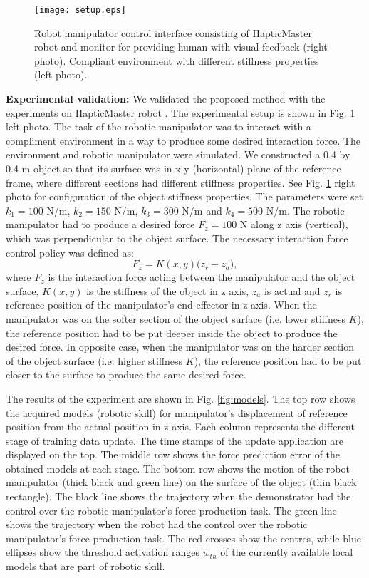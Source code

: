 \begin{figure}[!t]
	\centering
	\texttt{[image: setup.eps]}
	\caption{Robot manipulator control interface consisting of HapticMaster robot and monitor for providing human with visual feedback (right photo). Compliant environment with different stiffness properties (left photo).}
	\label{fig:setup}
\end{figure}

\textbf{Experimental validation:} We validated the proposed method with the experiments on HapticMaster robot \cite{Linde2002}. The experimental setup is shown in Fig. \ref{fig:setup} left photo. The task of the robotic manipulator was to interact with a compliment environment in a way to produce some desired interaction force. The environment and robotic manipulator were simulated. We constructed a 0.4 by 0.4 m object so that its surface was in x-y (horizontal) plane of the reference frame, where different sections had different stiffness properties. See Fig. \ref{fig:setup} right photo for configuration of the object stiffness properties. The parameters were set $k_1=100$ N/m, $k_2=150$ N/m, $k_3=300$ N/m and $k_4=500$ N/m. The robotic manipulator had to produce a desired force $F_z=100$ N along z axis (vertical), which was perpendicular to the object surface. The necessary interaction force control policy was defined as:
\begin{equation}
F_{z} = K(x,y) \big(z_r-z_a\big),\label{en:robotimp}
\end{equation}
where $F_{z}$ is the interaction force acting between the manipulator and the object surface, $K(x,y)$ is the stiffness of the object in z axis, $z_a$ is actual and $z_r$ is reference position of the manipulator's end-effector in z axis. When the manipulator was on the softer section of the object surface (i.e. lower stiffness $K$), the reference position had to be put deeper inside the object to produce the desired force. In opposite case, when the manipulator was on the harder section of the object surface (i.e. higher stiffness $K$), the reference position had to be put closer to the surface to produce the same desired force.

The results of the experiment are shown in Fig. \ref{fig:models}. The top row shows the acquired models (robotic skill) for manipulator's displacement of reference position from the actual position in z axis. Each column represents the different stage of training data update. The time stamps of the update application are displayed on the top. The middle row shows the force prediction error of the obtained models at each stage. The bottom row shows the motion of the robot manipulator (thick black and green line) on the surface of the object (thin black rectangle). The black line shows the trajectory when the demonstrator had the control over the robotic manipulator's force production task. The green line shows the trajectory when the robot had the control over the robotic manipulator's force production task. The red crosses show the centres, while blue ellipses show the threshold activation ranges $w_{th}$ of the currently available local models that are part of robotic skill.

